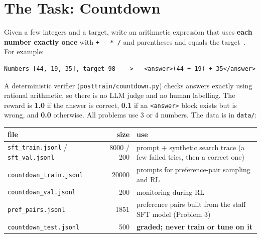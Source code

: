 \documentclass[11pt]{article}
\newcommand{\file}[1]{\texttt{#1}}
\begin{document}
\section*{The Task: Countdown}
Given a few integers and a target, write an arithmetic expression that uses \textbf{each number exactly once}
with \texttt{+ - * /} and parentheses and equals the target~\cite{streamofsearch}. For example:
\begin{lstlisting}
Numbers [44, 19, 35], target 98   ->   <answer>(44 + 19) + 35</answer>\end{lstlisting}
A deterministic verifier (\file{posttrain/countdown.py}) checks answers exactly using rational arithmetic, so
there is no LLM judge and no human labelling. The reward is \textbf{1.0} if the answer is correct, \textbf{0.1}
if an \texttt{<answer>} block exists but is wrong, and \textbf{0.0} otherwise. All problems use 3 or 4 numbers.
The data is in \file{data/}:
\begin{center}
\begin{tabular}{@{}lrp{6.4cm}@{}}
\toprule
file & size & use \\
\midrule
\file{sft\_train.jsonl} / \file{sft\_val.jsonl} & 8000 / 200 & prompt + synthetic search trace (a few failed tries, then a correct one) \\
\file{countdown\_train.jsonl} & 20000 & prompts for preference-pair sampling and RL \\
\file{countdown\_val.jsonl} & 200 & monitoring during RL \\
\file{pref\_pairs.jsonl} & 1851 & preference pairs built from the staff SFT model (Problem 3) \\
\file{countdown\_test.jsonl} & 500 & \textbf{graded; never train or tune on it} \\
\bottomrule
\end{tabular}
\end{center}
\end{document}

